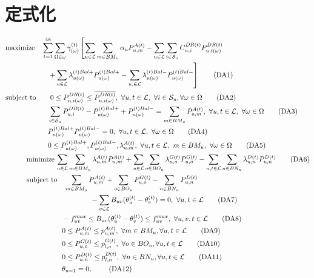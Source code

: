 \documentclass[a4j,10.5pt]{jarticle}
\begin{document}
\section{定式化}
\begin{align}
&{\rm maximize}\quad \sum_{t=1}^{48} \sum_{\Omega\in \omega}\gamma_{(\omega)}^{(t)}\left[\sum_{u\in \mathcal{L}} \sum_{m\in BM_u}\alpha_u P_{u,m}^{A(t)}-\sum_{u\in \mathcal{L}}\sum_{i\in \mathcal{S}_u}C_{u,i}^{DR(t)}P_{u,i(\omega)}^{DR(t)}\notag \right. \\
&~~~~~~~~~~~~~~~~~~\left.+\sum_{u\in \mathcal{L}}\lambda_{u(\omega)}^{(t)Bal+}P_{u(\omega)}^{(t)Bal+}-\sum_{u,\in \mathcal{L}}\lambda_{u(\omega)}^{(t)Bal-}P_{u(\omega)}^{(t)Bal-}\right]\label{DA1}\tag{DA1}\\
&{\rm subject\,\,to}\qquad 0\le P_{u,i(\omega)}^{DR(t)}\le \overline{P_{u,i(\omega)}^{DR(t)}},\ \forall u,t\in\mathcal{L},\ \forall i\in\mathcal{S}_u, \forall \omega \in \Omega \label{DA2}\tag{DA2}\\
&~~~~~~~~~~~~~~~~~~\sum_{i\in \mathcal{S}_u}P_{u,i}^{DR(t)}-P_{u(\omega)}^{(t)Bal+}+P_{u(\omega)}^{(t)Bal-}=\sum_{m\in BM_u}P_{u,m}^{A(t)},\ \forall u,t\in\mathcal{L},\ \forall \omega \in \Omega \label{DA3}\tag{DA3}\\
&~~~~~~~~~~~~~~~~~~P_{u(\omega)}^{(t)Bal+}P_{u(\omega)}^{(t)Bal-}=0,\ \forall u,t\in\mathcal{L},\ \forall \omega \in \Omega \label{DA4}\tag{DA4}\\
&~~~~~~~~~~~~~~~~~~0\le P_{u(\omega)}^{(t)Bal+},P_{u(\omega)}^{(t)Bal-},\lambda_{u,m}^{A(t)},\ \forall u,t\in\mathcal{L},\ m\in BM_u,\ \forall \omega \in \Omega\label{DA5}\tag{DA5}\\
&\quad \quad \quad {\rm minimize}\,\sum_{u\in \mathcal{L}}\sum_{m\in BM_u}\lambda^{A(t)}_{u,m}P^{A(t)}_{u,m}+\sum_{u\in \mathcal{L}}\sum_{o\in BO_u}\lambda^{G(t)}_{u,o}P^{G(t)}_{u,o}-\sum_{u,t\in \mathcal{L}}\sum_{n\in BN_u}\lambda^{D(t)}_{u,n}P^{D(t)}_{u,n}\label{DA6}\tag{DA6}\\
&\quad \quad \quad {\rm subject\,\,to}\quad \sum_{m\in BM_u}P^{A(t)}_{u,m}+\sum_{o\in BO_u}P^{G(t)}_{u,o}-\sum_{n\in BN_u}P^{D(t)}_{u,n}\notag \\
&\qquad \qquad \qquad  \qquad \qquad \qquad -\sum_{v\in \mathcal{L}}B_{uv}(\theta_u^{(t)}-\theta_v^{(t)})=0,\  \forall u,t \in \mathcal{L}\label{DA7}\tag{DA7}\\
&\qquad \qquad \qquad  \qquad -f^{max}_{uv} \leq B_{uv}(\theta_{u}^{(t)}-\theta_{v}^{(t)}) \leq f^{max}_{uv},\ \forall u,v,t \in \mathcal{L}\label{DA8}\tag{DA8}\\
&\qquad \qquad \qquad \qquad  0\leq P^{A(t)}_{u,m} \leq p^{A(t)}_{u,m},\ \forall m\in BM_u, \forall u,t \in \mathcal{L}\label{DA9}\tag{DA9}\\
&\qquad \qquad \qquad \qquad  0\leq P^{G(t)}_{u,o}\leq p^{G(t)}_{l,o},\ \forall o\in BO_u, \forall u,t \in \mathcal{L}\label{DA10}\tag{DA10}\\
&\qquad \qquad \qquad \qquad  0\leq P^{D(t)}_{u,n} \leq p^{D(t)}_{l,n},\ \forall n\in BN_u, \forall u,t \in \mathcal{L}\label{DA11}\tag{DA11}\\
&\qquad \qquad \qquad \qquad  \theta_{u=1}=0,\ \label{DA12}\tag{DA12}
\end{align}
\newpage
\end{document}
